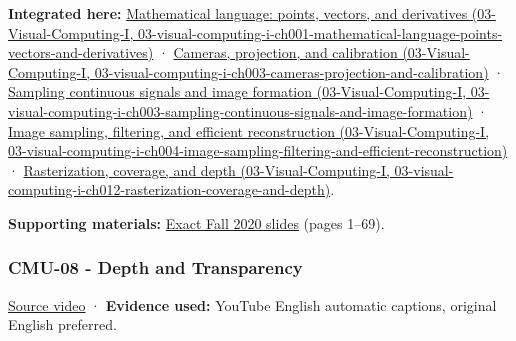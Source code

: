 \textbf{Integrated here:} \href{../03-Visual-Computing-I/main.pdf\#nameddest=03-visual-computing-i-ch001-mathematical-language-points-vectors-and-derivatives}{Mathematical language: points, vectors, and derivatives (03-Visual-Computing-I, 03-visual-computing-i-ch001-mathematical-language-points-vectors-and-derivatives)} · \href{../03-Visual-Computing-I/main.pdf\#nameddest=03-visual-computing-i-ch003-cameras-projection-and-calibration}{Cameras, projection, and calibration (03-Visual-Computing-I, 03-visual-computing-i-ch003-cameras-projection-and-calibration)} · \href{../03-Visual-Computing-I/main.pdf\#nameddest=03-visual-computing-i-ch003-sampling-continuous-signals-and-image-formation}{Sampling continuous signals and image formation (03-Visual-Computing-I, 03-visual-computing-i-ch003-sampling-continuous-signals-and-image-formation)} · \href{../03-Visual-Computing-I/main.pdf\#nameddest=03-visual-computing-i-ch004-image-sampling-filtering-and-efficient-reconstruction}{Image sampling, filtering, and efficient reconstruction (03-Visual-Computing-I, 03-visual-computing-i-ch004-image-sampling-filtering-and-efficient-reconstruction)} · \href{../03-Visual-Computing-I/main.pdf\#nameddest=03-visual-computing-i-ch012-rasterization-coverage-and-depth}{Rasterization, coverage, and depth (03-Visual-Computing-I, 03-visual-computing-i-ch012-rasterization-coverage-and-depth)}.

\textbf{Supporting materials:} \href{https://15462.courses.cs.cmu.edu/fall2020content/lectures/07_texture/07_texture_slides.pdf}{Exact Fall 2020 slides} (pages 1--69).

\subsubsection{CMU-08 - Depth and Transparency}\label{04-visual-computing-ii-ch036-cmu-08---depth-and-transparency}

\href{https://www.youtube.com/watch?v=WtYfF48Z9mA}{Source video} · \textbf{Evidence used:} YouTube English automatic captions, original English preferred.

